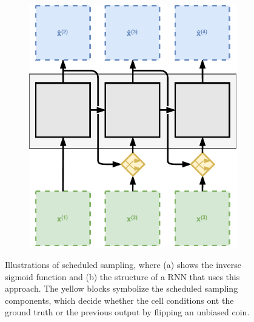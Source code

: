 \begin{figure}[htpb]
\centering
\begin{subfigure}{0.5\textwidth}
  \centering
  \caption{}
  \label{fig:sched-sample-inv-sig}
\end{subfigure}%
\begin{subfigure}{0.5\textwidth}
  \centering
  \includegraphics[width=.8\linewidth]{figures/sched_sample.pdf}
  \caption{}
  \label{fig:sched-sample-process}
\end{subfigure}
\caption[Scheduled Sampling]{Illustrations of scheduled sampling, where (a) shows the inverse sigmoid function and (b) the structure of a RNN that uses this approach. The yellow blocks symbolize the scheduled sampling components, which decide whether the cell conditions ont the ground truth or the previous output by flipping an unbiased coin.} \label{fig:sched-sample}
\end{figure}





